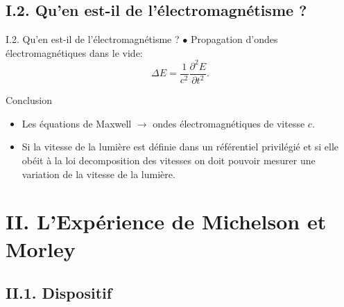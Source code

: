 \documentclass{beamer}
\begin{document}
\subsection{I.2. Qu'en est-il de l'électromagnétisme ?}
\begin{frame}{I.2. Qu'en est-il de l'électromagnétisme ?}
$\bullet$ Propagation d'ondes électromagnétiques dans le vide:
\begin{equation}
    \Delta E = \dfrac{1}{c^2}\dfrac{\partial^2 E}{\partial t^2}.
\end{equation}

\begin{alertblock}{Conclusion}
    \begin{itemize}
        \item Les équations de Maxwell $\rightarrow$ ondes électromagnétiques de vitesse $c$.

    \item Si la vitesse de la lumière est définie dans un référentiel privilégié et si elle obéit à la loi decomposition des vitesses on doit pouvoir mesurer une variation de la vitesse de la lumière.
    \end{itemize}
\end{alertblock}

    
    
\end{frame}

\section{II. L'Expérience de Michelson et Morley}

\subsection{II.1. Dispositif}
\end{document}
